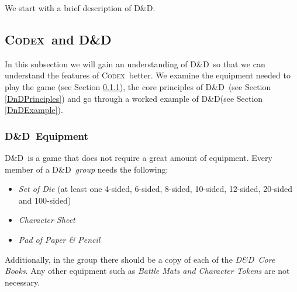 \documentclass[final]{cmpreport}
\newcommand{\dnd}{D\&D}
\newcommand{\Codex}{\textsc{Codex}}
\begin{document}
	We start with a brief description of \dnd. 
	
	\subsection{\Codex \ and \dnd} \label{DnDRules&Lit}
	In this subsection we will gain an understanding of \dnd \ so that we can understand the features of \Codex \ better. We examine the equipment needed to play the game (see Section \ref{DnDEquipment}), the core principles of \dnd \ (see Section \ref{DnDPrinciples}) and go through a worked example of \dnd (see Section \ref{DnDExample}).

	\subsubsection{\dnd \ Equipment} \label{DnDEquipment}
	\dnd \ is a game that does not require a great amount of equipment. Every member of a \dnd \ \emph{group} needs the following:
	\begin{itemize}
		\item \emph{Set of Die} (at least one 4-sided, 6-sided, 8-sided, 10-sided, 12-sided, 20-sided and 100-sided)
		\item \emph{Character Sheet}
		\item \emph{Pad of Paper \& Pencil}
	\end{itemize}
	Additionally, in the group there should be a copy of each of the \emph{\dnd \ Core Books}. Any other equipment such as \emph{Battle Mats and Character Tokens} are not necessary.
	
\end{document}
